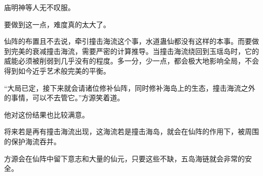 \begin{this_body}
庙明神等人无不叹服。

要做到这一点，难度真的太大了。

仙阵的布置且不去说，牵引撞击海流这个事，水道蛊仙都没有这样的本事。而要做到完美的衰减撞击海流，需要严密的计算推导。当撞击海流绕回到玉瑶岛时，它的威能必须被削弱到几乎没有的程度。多一分，少一点，都会极大地影响全局，不会得到如今近乎艺术般完美的平衡。

“大局已定，接下来就会请诸位修补仙阵，同时修补海岛上的生态，撞击海流之外的事情，可以不去管它。”方源笑着道。

他对这份结果也比较满意。

将来若是再有撞击海流出现，这海流若是撞击海岛，就会在仙阵的作用下，被周围的保护海流吞并。

方源会在仙阵中留下意志和大量的仙元，只要这些不缺，五岛海链就会非常的安全。

\end{this_body}

